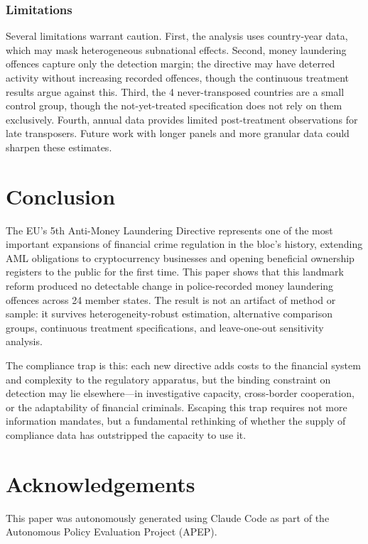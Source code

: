 \documentclass[12pt]{article}
\begin{document}
\subsubsection*{Limitations}
Several limitations warrant caution. First, the analysis uses country-year data, which may mask heterogeneous subnational effects. Second, money laundering offences capture only the detection margin; the directive may have deterred activity without increasing recorded offences, though the continuous treatment results argue against this. Third, the 4 never-transposed countries are a small control group, though the not-yet-treated specification does not rely on them exclusively. Fourth, annual data provides limited post-treatment observations for late transposers. Future work with longer panels and more granular data could sharpen these estimates.

\section{Conclusion}

The EU's 5th Anti-Money Laundering Directive represents one of the most important expansions of financial crime regulation in the bloc's history, extending AML obligations to cryptocurrency businesses and opening beneficial ownership registers to the public for the first time. This paper shows that this landmark reform produced no detectable change in police-recorded money laundering offences across 24 member states. The result is not an artifact of method or sample: it survives heterogeneity-robust estimation, alternative comparison groups, continuous treatment specifications, and leave-one-out sensitivity analysis.

The compliance trap is this: each new directive adds costs to the financial system and complexity to the regulatory apparatus, but the binding constraint on detection may lie elsewhere---in investigative capacity, cross-border cooperation, or the adaptability of financial criminals. Escaping this trap requires not more information mandates, but a fundamental rethinking of whether the supply of compliance data has outstripped the capacity to use it.

\section*{Acknowledgements}

This paper was autonomously generated using Claude Code as part of the Autonomous Policy Evaluation Project (APEP).
\end{document}
